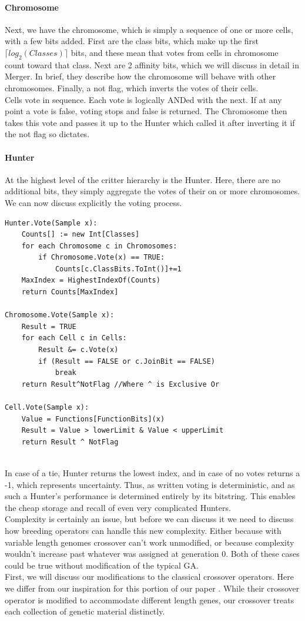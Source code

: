 \paragraph{Chromosome}
Next, we have the chromosome, which is simply a sequence of one or more cells, with a few bits added.  First are the class bits, which make up the first $\lceil log_2(Classes)\rceil$ bits, and these mean that votes from cells in chromosome count toward that class.  Next are 2 affinity bits, which we will discuss in detail in Merger.  In brief, they describe how the chromosome will behave with other chromosomes.  Finally, a not flag, which inverts the votes of their cells.\\
Cells vote in sequence.  Each vote is logically ANDed with the next.  If at any point a vote is false, voting stops and false is returned.  The Chromosome then takes this vote and passes it up to the Hunter which called it after inverting it if the not flag so dictates.
\paragraph{Hunter}
At the highest level of the critter hierarchy is the Hunter.  Here, there are no additional bits, they simply aggregate the votes of their on or more chromosomes.  We can now discuss explicitly the voting process.  
\begin{lstlisting}[language = algorithm, caption={Purist Voting Algorithms}, label = {fig:vote}]
Hunter.Vote(Sample x):
	Counts[] := new Int[Classes]
	for each Chromosome c in Chromosomes:
		if Chromosome.Vote(x) == TRUE:
			Counts[c.ClassBits.ToInt()]+=1
	MaxIndex = HighestIndexOf(Counts)
	return Counts[MaxIndex]
	
Chromosome.Vote(Sample x):
	Result = TRUE
	for each Cell c in Cells:
		Result &= c.Vote(x)
		if (Result == FALSE or c.JoinBit == FALSE) 
			break
	return Result^NotFlag //Where ^ is Exclusive Or
	
Cell.Vote(Sample x):
	Value = Functions[FunctionBits](x)
	Result = Value > lowerLimit & Value < upperLimit
	return Result ^ NotFlag
	 
\end{lstlisting}
In case of a tie, Hunter returns the lowest index, and in case of no votes returns a -1, which represents uncertainty.  Thus, as written voting is deterministic, and as such a Hunter's performance is determined entirely by its bitstring.  This enables the cheap storage and recall of even very complicated Hunters.\\
Complexity is certainly an issue, but before we can discuss it we need to discuss how breeding operators can handle this new complexity.  Either because with variable length genomes crossover can't work unmodified, or because complexity wouldn't increase past whatever was assigned at generation 0.  Both of these cases could be true without modification of the typical GA.\\
First, we will discuss our modifications to the classical crossover operators.  Here we differ from our inspiration for this portion of our paper \cite{kharma_project_2004}.  While their crossover operator is modified to accommodate different length genes, our crossover treats each collection of genetic material distinctly.\\
